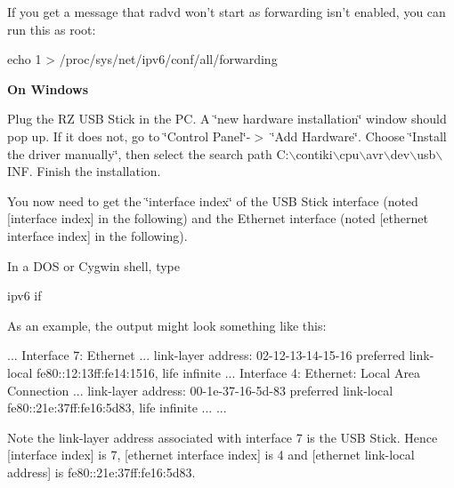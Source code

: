 \-If you get a message that radvd won't start as forwarding isn't enabled, you can run this as root\-:

\begin{DoxyVerb}
echo 1 > /proc/sys/net/ipv6/conf/all/forwarding
\end{DoxyVerb}


{\bfseries \-On \-Windows}\par


\-Plug the \-R\-Z \-U\-S\-B \-Stick in the \-P\-C. \-A \char`\"{}new hardware installation\char`\"{} window should pop up. \-If it does not, go to \char`\"{}\-Control Panel\char`\"{}-\/$>$ \char`\"{}\-Add Hardware\char`\"{}. \-Choose \char`\"{}\-Install the driver manually\char`\"{}, then select the search path \-C\-:$\backslash$contiki$\backslash$cpu$\backslash$avr$\backslash$dev$\backslash$usb$\backslash$\-I\-N\-F. \-Finish the installation.

\-You now need to get the \char`\"{}interface index\char`\"{} of the \-U\-S\-B \-Stick interface (noted \mbox{[}interface index\mbox{]} in the following) and the \-Ethernet interface (noted \mbox{[}ethernet interface index\mbox{]} in the following).

\-In a \-D\-O\-S or \-Cygwin shell, type \begin{DoxyVerb}
ipv6 if
\end{DoxyVerb}


\-As an example, the output might look something like this\-:

\begin{DoxyVerb}
...
Interface 7: Ethernet
 ...
 link-layer address: 02-12-13-14-15-16
 preferred link-local fe80::12:13ff:fe14:1516, life infinite
 ...
Interface 4: Ethernet: Local Area Connection
 ...
 link-layer address: 00-1e-37-16-5d-83
 preferred link-local fe80::21e:37ff:fe16:5d83, life infinite
 ...
...
\end{DoxyVerb}


\-Note the link-\/layer address associated with interface 7 is the \-U\-S\-B \-Stick. \-Hence \mbox{[}interface index\mbox{]} is 7, \mbox{[}ethernet interface index\mbox{]} is 4 and \mbox{[}ethernet link-\/local address\mbox{]} is fe80\-:\-:21e\-:37ff\-:fe16\-:5d83.

